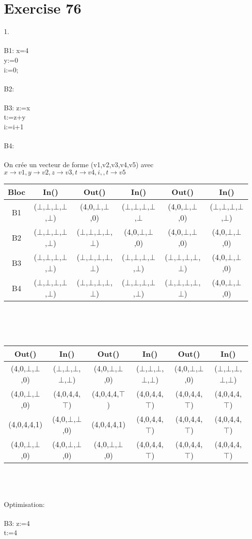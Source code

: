 \documentclass[10pt,a4paper]{article}
\begin{document}
\section{Exercise 76}
{\large 1.}\\\\
B1: x=4\\y:=0\\i:=0;\\
\\
B2: \\
\\
B3: z:=x\\t:=z+y\\i:=i+1\\
\\
B4: \\
\\
On crée un vecteur de forme (v1,v2,v3,v4,v5) avec $x \rightarrow v1,y \rightarrow v2,z \rightarrow v3, t \rightarrow v4, i, , t \rightarrow v5$\\
\begin{tabular}{|c|c|c|c|c|c|}
\hline 
Bloc & In() & Out() & In() & Out() & In()  \\ 
\hline 
B1 & ($\bot$,$\bot$,$\bot$,$\bot$,$\bot$) & (4,0,$\bot$,$\bot$,0) & ($\bot$,$\bot$,$\bot$,$\bot$,$\bot$ & (4,0,$\bot$,$\bot$,0) & ($\bot$,$\bot$,$\bot$,$\bot$,$\bot$)  \\ 
\hline 
B2 & ($\bot$,$\bot$,$\bot$,$\bot$,$\bot$) & ($\bot$,$\bot$,$\bot$,$\bot$,$\bot$) & (4,0,$\bot$,$\bot$,0) & (4,0,$\bot$,$\bot$,0) & (4,0,$\bot$,$\bot$,0) \\ 
\hline 
B3 & ($\bot$,$\bot$,$\bot$,$\bot$,$\bot$) & ($\bot$,$\bot$,$\bot$,$\bot$,$\bot$) & ($\bot$,$\bot$,$\bot$,$\bot$,$\bot$) & ($\bot$,$\bot$,$\bot$,$\bot$,$\bot$) & (4,0,$\bot$,$\bot$,0)  \\ 
\hline 
B4 & ($\bot$,$\bot$,$\bot$,$\bot$,$\bot$) & ($\bot$,$\bot$,$\bot$,$\bot$,$\bot$) & ($\bot$,$\bot$,$\bot$,$\bot$,$\bot$) & ($\bot$,$\bot$,$\bot$,$\bot$,$\bot$) & (4,0,$\bot$,$\bot$,0)  \\ 
\hline 
\end{tabular} \\\\\\
\begin{tabular}{|c|c|c|c|c|c|}
\hline
 Out() & In() & Out() & In() & Out() & In()\\
\hline 
(4,0,$\bot$,$\bot$,0) & ($\bot$,$\bot$,$\bot$,$\bot$,$\bot$) & (4,0,$\bot$,$\bot$,0) & ($\bot$,$\bot$,$\bot$,$\bot$,$\bot$) & (4,0,$\bot$,$\bot$,0) & ($\bot$,$\bot$,$\bot$,$\bot$,$\bot$)\\
\hline 
(4,0,$\bot$,$\bot$,0) & (4,0,4,4,$\top$) & (4,0,4,4,$\top$) & (4,0,4,4,$\top$) & (4,0,4,4,$\top$) & (4,0,4,4,$\top$)\\
\hline
(4,0,4,4,1) & (4,0,$\bot$,$\bot$,0) & (4,0,4,4,1) & (4,0,4,4,$\top$) & (4,0,4,4,$\top$) & (4,0,4,4,$\top$)\\
\hline  
 (4,0,$\bot$,$\bot$,0) &(4,0,$\bot$,$\bot$,0) & (4,0,$\bot$,$\bot$,0) & (4,0,4,4,$\top$) & (4,0,4,4,$\top$) & (4,0,4,4,$\top$)\\
\hline 
\end{tabular} \\\\\\
Optimisation:\\\\
B3: z:=4\\
t:=4\\
\end{document}
